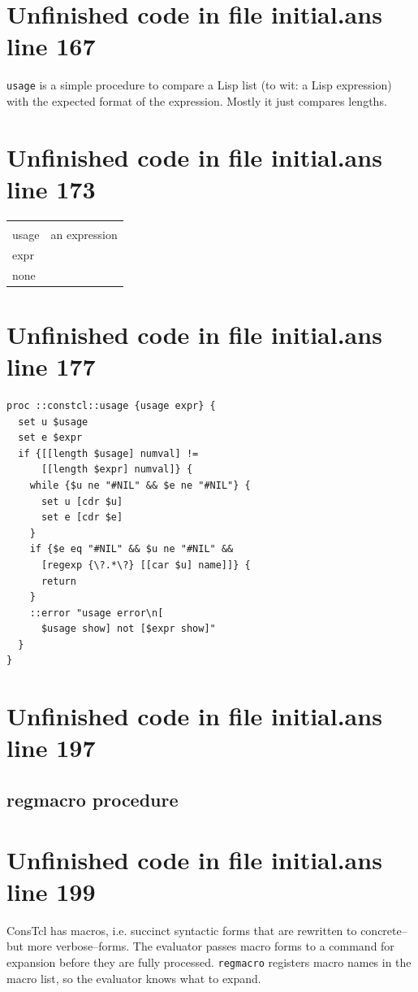 \documentclass[twoside,9pt]{report}
\begin{document}
\section{Unfinished code in file initial.ans line 167}


\texttt{usage} is a simple procedure to compare a Lisp list (to wit: a Lisp expression) with the expected format of the expression. Mostly it just compares lengths.

\section{Unfinished code in file initial.ans line 173}
\noindent\begin{tabular}{ |p{1.9cm} p{8cm}| }
\hline
\rowcolor[HTML]{CCCCCC} \multicolumn{2}{|l|}{\bf usage (internal)} \\
usage & an expression \\
expr &  \\
none &  \\
\hline
\end{tabular}
\section{Unfinished code in file initial.ans line 177}
\begin{lstlisting}
proc ::constcl::usage {usage expr} {
  set u $usage
  set e $expr
  if {[[length $usage] numval] !=
      [[length $expr] numval]} {
    while {$u ne "#NIL" && $e ne "#NIL"} {
      set u [cdr $u]
      set e [cdr $e]
    }
    if {$e eq "#NIL" && $u ne "#NIL" &&
      [regexp {\?.*\?} [[car $u] name]]} {
      return
    }
    ::error "usage error\n[
      $usage show] not [$expr show]"
  }
}
\end{lstlisting}
\section{Unfinished code in file initial.ans line 197}
\subsection{regmacro procedure}
\label{regmacro-procedure}
\section{Unfinished code in file initial.ans line 199}


ConsTcl has macros, i.e. succinct syntactic forms that are rewritten to concrete--but more verbose--forms. The evaluator passes macro forms to a command for expansion before they are fully processed. \texttt{regmacro} registers macro names in the macro list, so the evaluator knows what to expand.
\end{document}
